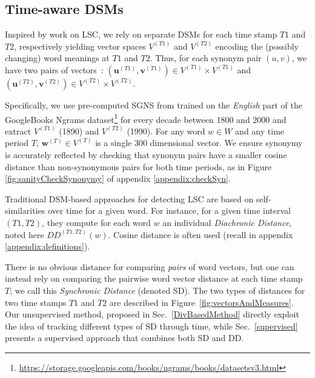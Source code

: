\documentclass[11pt]{article}
\newcommand{\vocab}{W}
\newcommand{\vectorspaceT}{V^{(T)}}
\newcommand{\vectorspaceOne}{V^{(T1)}}
\newcommand{\vectorspaceTwo}{V^{(T2)}}
\newcommand{\reprVector}[2]{\mathbf{#1}^{(#2)}}
\newcommand{\reprVectorT}[1]{\reprVector{#1}{T}}
\newcommand{\wTvector}{\reprVectorT{w}}
\newcommand{\synOne}{u}%
\newcommand{\synTwo}{v}%
\newcommand{\synpair}{(\synOne,\synTwo)}
\newcommand{\firstTime}{T1}
\newcommand{\secondTime}{T2}
\begin{document}
\subsection{Time-aware DSMs}

Inspired by work on LSC, we rely on separate DSMs for each time stamp $\firstTime$ and $\secondTime$, respectively yielding vector spaces $\vectorspaceOne$ and $\vectorspaceTwo$ encoding the (possibly changing) word meanings at $\firstTime$ and $\secondTime$. Thus, for each synonym pair $\synpair$, we have two pairs of vectors~: $(\reprVector{\synOne}{\firstTime},\reprVector{\synTwo}{\firstTime})\in\vectorspaceOne\times\vectorspaceOne$ and $(\reprVector{\synOne}{\secondTime},\reprVector{\synTwo}{\secondTime})\in\vectorspaceTwo\times\vectorspaceTwo$.

Specifically, we use pre-computed SGNS \citep{mikolov-etal-2013-sgns} from \citet{hamilton-etal-2016-diachronic} trained on the \textit{English} part of the GoogleBooks Ngrams dataset\footnote{\url{https://storage.googleapis.com/books/ngrams/books/datasetsv3.html}} for every decade between 1800 and 2000 and extract $\vectorspaceOne$ (1890) and $\vectorspaceTwo$ (1990). For any word $w\in\vocab$ and any time period $T$, $\wTvector \in \vectorspaceT$ is a single 300 dimensional vector. 
We ensure synonymy is accurately reflected by checking that synonym pairs have a smaller cosine distance than non-synonymous pairs for both time periods, as in Figure \ref{fig:sanityCheckSynonymy} of appendix \ref{appendix:checkSyn}.

Traditional DSM-based approaches for detecting LSC are based on self-similarities over time for a given word. For instance, for a given time interval $(T1,T2)$, they compute for each word $w$ an individual \textit{Diachronic Distance}, noted here $DD^{(T1,T2)}(w)$. Cosine distance is often used (recall in appendix \ref{appendix:definitions}).


There is no obvious distance for comparing \textit{pairs} of word vectors, but one can instead rely on comparing the pairwise word vector distance at each time stamp $T$; we call this \textit{Synchronic Distance} (denoted SD). The two types of distances for two time stamps $\firstTime$ and $\secondTime$ are described in Figure~\ref{fig:vectorsAndMeasures}.  Our unsupervised method, proposed in Sec.~\ref{DivBasedMethod} directly exploit the idea of tracking different types of SD through time, while Sec.~\ref{supervised} presents a supervised approach that combines both SD and DD. 
\end{document}
